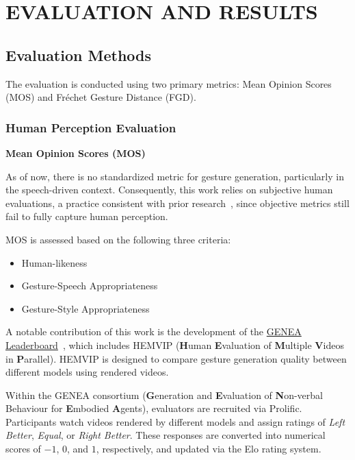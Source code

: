 \section{EVALUATION AND RESULTS}
\label{chap:evalution}

\subsection{Evaluation Methods}

The evaluation is conducted using two primary metrics: Mean Opinion Scores (MOS) and Fréchet Gesture Distance (FGD).

\subsubsection{Human Perception Evaluation}

\textbf{Mean Opinion Scores (MOS)}

As of now, there is no standardized metric for gesture generation, particularly in the speech-driven context. Consequently, this work relies on subjective human evaluations, a practice consistent with prior research~\cite{yoon2022genea, kucherenko2021large, alexanderson2022listen}, since objective metrics still fail to fully capture human perception.

MOS is assessed based on the following three criteria:

\begin{itemize}
	\item Human-likeness
	\item Gesture-Speech Appropriateness
	\item Gesture-Style Appropriateness
\end{itemize}

A notable contribution of this work is the development of the \hyperlink{https://genea-workshop.github.io/leaderboard/}{GENEA Leaderboard}~\cite{nagy2024towards}, which includes HEMVIP (\textbf{H}uman \textbf{E}valuation of \textbf{M}ultiple \textbf{V}ideos in \textbf{P}arallel). HEMVIP is designed to compare gesture generation quality between different models using rendered videos.

Within the GENEA consortium (\textbf{G}eneration and \textbf{E}valuation of \textbf{N}on-verbal Behaviour for \textbf{E}mbodied \textbf{A}gents), evaluators are recruited via Prolific. Participants watch videos rendered by different models and assign ratings of \textit{Left Better}, \textit{Equal}, or \textit{Right Better}. These responses are converted into numerical scores of $-1$, $0$, and $1$, respectively, and updated via the Elo rating system.

